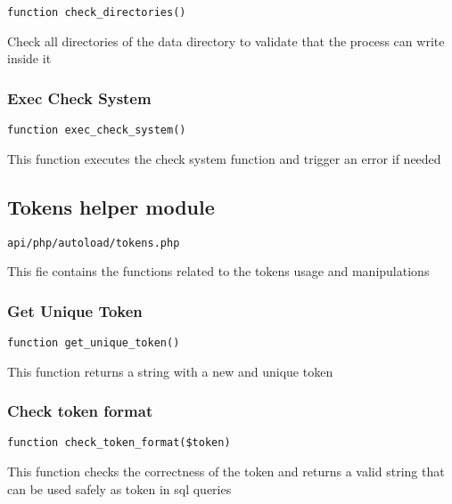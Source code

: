 \documentclass[a4paper]{article}
\begin{document}
\begin{lstlisting}
function check_directories()
\end{lstlisting}

Check all directories of the data directory to validate that the process can write inside it

\hypertarget{toc257}{}
\subsubsection{Exec Check System}

\begin{lstlisting}
function exec_check_system()
\end{lstlisting}

This function executes the check system function and trigger an error if needed

\hypertarget{toc258}{}
\subsection{Tokens helper module}

\begin{lstlisting}
api/php/autoload/tokens.php
\end{lstlisting}

This fie contains the functions related to the tokens usage and manipulations

\hypertarget{toc259}{}
\subsubsection{Get Unique Token}

\begin{lstlisting}
function get_unique_token()
\end{lstlisting}

This function returns a string with a new and unique token

\hypertarget{toc260}{}
\subsubsection{Check token format}

\begin{lstlisting}
function check_token_format($token)
\end{lstlisting}

This function checks the correctness of the token and returns a valid
string that can be used safely as token in sql queries
\end{document}
